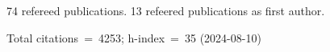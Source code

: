 74 refereed publications. 13 refeered publications as first author.

Total citations~=~4253; h-index~=~35 (2024-08-10)